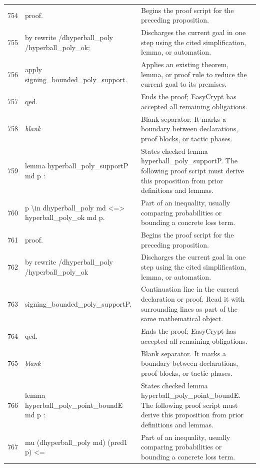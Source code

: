 \documentclass[10pt]{article}
\begin{document}
\begin{longtable}{r L{0.53\textwidth} L{0.37\textwidth}}
754 & {\ttfamily\scriptsize proof.} & Begins the proof script for the preceding proposition. \\
755 & {\ttfamily\scriptsize by rewrite /dhyperball\_poly /hyperball\_poly\_ok;} & Discharges the current goal in one step using the cited simplification, lemma, or automation. \\
756 & {\ttfamily\scriptsize    apply signing\_bounded\_poly\_support.} & Applies an existing theorem, lemma, or proof rule to reduce the current goal to its premises. \\
757 & {\ttfamily\scriptsize qed.} & Ends the proof; EasyCrypt has accepted all remaining obligations. \\
758 & {\ttfamily\scriptsize \emph{blank}} & Blank separator.  It marks a boundary between declarations, proof blocks, or tactic phases. \\
759 & {\ttfamily\scriptsize lemma hyperball\_poly\_supportP md p :} & States checked lemma hyperball\_poly\_supportP.  The following proof script must derive this proposition from prior definitions and lemmas. \\
760 & {\ttfamily\scriptsize   p \textbackslash{}in dhyperball\_poly md <=> hyperball\_poly\_ok md p.} & Part of an inequality, usually comparing probabilities or bounding a concrete loss term. \\
761 & {\ttfamily\scriptsize proof.} & Begins the proof script for the preceding proposition. \\
762 & {\ttfamily\scriptsize by rewrite /dhyperball\_poly /hyperball\_poly\_ok} & Discharges the current goal in one step using the cited simplification, lemma, or automation. \\
763 & {\ttfamily\scriptsize            signing\_bounded\_poly\_supportP.} & Continuation line in the current declaration or proof.  Read it with surrounding lines as part of the same mathematical object. \\
764 & {\ttfamily\scriptsize qed.} & Ends the proof; EasyCrypt has accepted all remaining obligations. \\
765 & {\ttfamily\scriptsize \emph{blank}} & Blank separator.  It marks a boundary between declarations, proof blocks, or tactic phases. \\
766 & {\ttfamily\scriptsize lemma hyperball\_poly\_point\_boundE md p :} & States checked lemma hyperball\_poly\_point\_boundE.  The following proof script must derive this proposition from prior definitions and lemmas. \\
767 & {\ttfamily\scriptsize   mu (dhyperball\_poly md) (pred1 p) <=} & Part of an inequality, usually comparing probabilities or bounding a concrete loss term. \\

\end{longtable}
\end{document}
